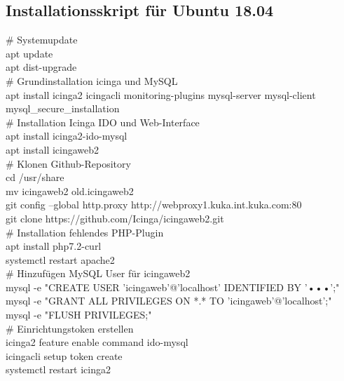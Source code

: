 \subsection{Installationsskript für Ubuntu 18.04}
\label{app:skript}

\# Systemupdate \\
apt update\\
apt dist-upgrade\\

\# Grundinstallation icinga und MySQL\\
apt install icinga2 icingacli monitoring-plugins mysql-server mysql-client\\
mysql\_{}secure\_{}installation\\

\# Installation Icinga IDO und Web-Interface\\
apt install icinga2-ido-mysql\\
apt install icingaweb2\\

\# Klonen Github-Repository\\
cd /usr/share\\
mv icingaweb2 old.icingaweb2\\
git config --global http.proxy http://webproxy1.kuka.int.kuka.com:80\\
git clone https://github.com/Icinga/icingaweb2.git\\

\# Installation fehlendes PHP-Plugin\\
apt install php7.2-curl\\
systemctl restart apache2\\

\# Hinzufügen MySQL User für icingaweb2\\
mysql -e "CREATE USER 'icingaweb'@'localhost' IDENTIFIED BY '•••';"\\
mysql -e "GRANT ALL PRIVILEGES ON *.* TO 'icingaweb'@'localhost';"\\
mysql -e "FLUSH PRIVILEGES;"\\

\# Einrichtungstoken erstellen\\
icinga2 feature enable command ido-mysql\\
icingacli setup token create\\
systemctl restart icinga2\\